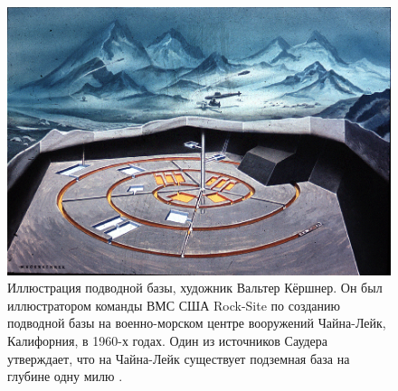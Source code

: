 \documentclass[10pt,twocolumn,letterpaper]{article}
\begin{document}
\begin{figure}[t]
\begin{center}
   \includegraphics[width=1\linewidth]{undersea.jpg}
\end{center}
   \caption{Иллюстрация подводной базы, художник Вальтер Кёршнер. Он был иллюстратором команды ВМС США Rock-Site по созданию подводной базы на военно-морском центре вооружений Чайна-Лейк, Калифорния, в 1960-х годах. Один из источников Саудера утверждает, что на Чайна-Лейк существует подземная база на глубине одну милю \cite{22,23}.}
\label{fig:5}
\label{fig:onecol}
\end{figure}
\end{document}
